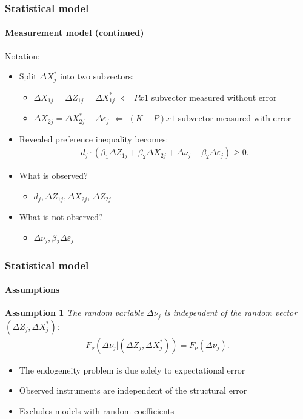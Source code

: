 \documentclass[10pt,letterpaper]{beamer}
\begin{document}
\begin{frame}
\frametitle{Statistical model} \framesubtitle{Measurement model (continued)}

Notation:

\begin{itemize}
\item Split $\Delta X^{*}_{j}$ into two subvectors: 

\begin{itemize}
\item $\Delta X_{1j} = \Delta Z_{1j} = \Delta X^{*}_{1j}$ $\Longleftarrow$ $%
Px1$ subvector measured without error 

\item $\Delta X_{2j} = \Delta X^{*}_{2j}+\Delta\varepsilon_{j}$ $%
\Longleftarrow$ $(K-P)x1$ subvector measured with error 
\end{itemize}

\item Revealed preference inequality becomes:  
\begin{align*}
d_{j} \cdot (\beta_{1}\Delta Z_{1j}+\beta_{2}\Delta
X_{2j}+\Delta\nu_{j}-\beta_{2}\Delta\varepsilon_{j})\geq 0.
\end{align*}

\item What is observed? 

\begin{itemize}
\item $d_{j}, \Delta Z_{1j},\Delta X_{2j}$, $\Delta Z_{2j}$ 
\end{itemize}

\item What is not observed? 

\begin{itemize}
\item $\Delta\nu_{j},\beta_{2}\Delta\varepsilon_{j}$ 
\end{itemize}
\end{itemize}
\end{frame}


\begin{frame}
\frametitle{Statistical model} \framesubtitle{Assumptions}

\textbf{Assumption 1} \textit{The random variable $\Delta\nu_{j}$ is
independent of the random vector $(\Delta Z_{j},\Delta X^{*}_{j})$: 
\begin{align*}
F_{\nu}(\Delta\nu_{j}|(\Delta Z_{j},\Delta
X^{*}_{j}))=F_{\nu}(\Delta\nu_{j}).
\end{align*}%
} \pause

\begin{itemize}
\item The endogeneity problem is due solely to expectational error

\item Observed instruments are independent of the structural error

\item Excludes models with random coefficients
\end{itemize}
\end{frame}
\end{document}
